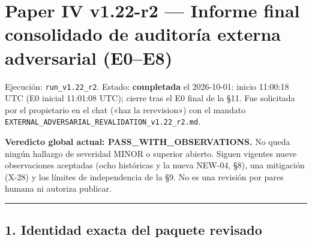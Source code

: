 \documentclass[
]{article}
\author{}
\date{}
\begin{document}
\section{Paper IV v1.22-r2 --- Informe final consolidado de auditoría
externa adversarial
(E0--E8)}\label{paper-iv-v122-r2--informe-final-consolidado-de-auditoruxeda-externa-adversarial-e0e8}

Ejecución: \texttt{run\_v1.22\_r2}. Estado: \textbf{completada} el
2026-10-01: inicio 11:00:18 UTC (E0 inicial 11:01:08 UTC); cierre tras
el E0 final de la §11. Fue solicitada por el propietario en el chat
(«haz la rerevision») con el mandato
\texttt{EXTERNAL\_ADVERSARIAL\_REVALIDATION\_v1.22\_r2.md}.

\textbf{Veredicto global actual: PASS\_WITH\_OBSERVATIONS.} No queda
ningún hallazgo de severidad MINOR o superior abierto. Siguen vigentes
nueve observaciones aceptadas (ocho históricas y la nueva NEW-04, §8),
una mitigación (X-28) y los límites de independencia de la §9. No es una
revisión por pares humana ni autoriza publicar.

\begin{center}\rule{0.5\linewidth}{0.5pt}\end{center}

\subsection{1. Identidad exacta del paquete
revisado}\label{1-identidad-exacta-del-paquete-revisado}
\end{document}
